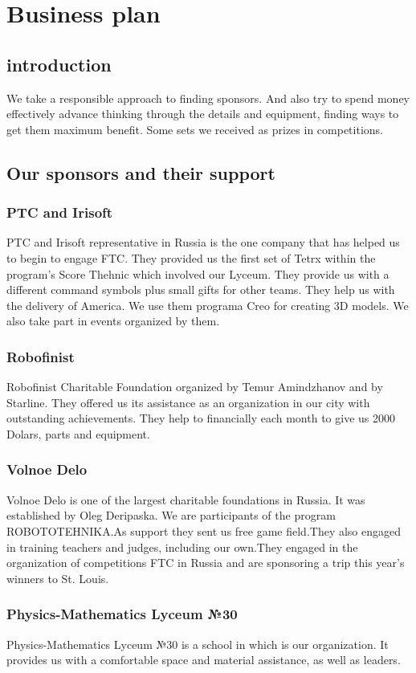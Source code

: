 \section{Business plan}
	\subsection{introduction}
	We take a responsible approach to finding sponsors. And also try to spend money effectively advance thinking through the details and equipment, finding ways to get them maximum benefit. Some sets we received as prizes in competitions.
	
	\subsection{Our sponsors and their support}
		\subsubsection{PTC and Irisoft}
		PTC and Irisoft representative in Russia is the one company that has helped us to begin to engage FTC. They provided us the first set of Tetrx within the program's Score Thehnic which involved our Lyceum. They provide us with a different command symbols plus small gifts for other teams. They help us with the delivery of America. We use them programa Creo for creating 3D models. We also take part in events organized by them.
		\subsubsection{Robofinist}	
		Robofinist Charitable Foundation organized by Temur Amindzhanov and by Starline. They offered us its assistance as an organization in our city with outstanding achievements. They help to financially each month to give us 2000 Dolars, parts and equipment.
		\subsubsection{Volnoe Delo}
		Volnoe Delo is one of the largest charitable foundations in Russia. It was established by Oleg Deripaska. We are participants of the program ROBOTOTEHNIKA.As support they sent us free game field.They also engaged in training teachers and judges, including our own.They engaged in the organization of competitions FTC in Russia and are sponsoring a trip this year's winners to St. Louis.	
		\subsubsection{Physics-Mathematics Lyceum №30}
		Physics-Mathematics Lyceum №30 is a school in which is our organization. It provides us with a comfortable space and material assistance, as well as leaders.
		
